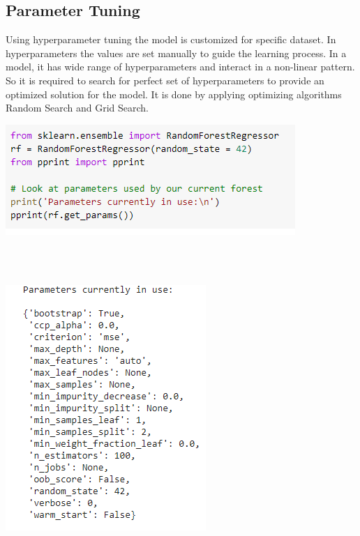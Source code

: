 \documentclass[journal,twoside,web]{ieeecolor}
\begin{document}
\subsection{Parameter Tuning}
Using hyperparameter tuning the model is customized for specific dataset. In hyperparameters the values are set manually to guide the learning process. In a model, it has wide range of hyperparameters and interact in a non-linear pattern. So it is required to search for perfect set of hyperparameters to provide an optimized solution for the model. It is done by applying optimizing algorithms Random Search and Grid Search.
\\
\begin{center}
\includegraphics[scale=0.60]{Picture21.png}
\end{center}
\\
\\
\begin{center}
\includegraphics[scale=0.60]{Picture22.png}
\end{center}
\\
\end{document}
